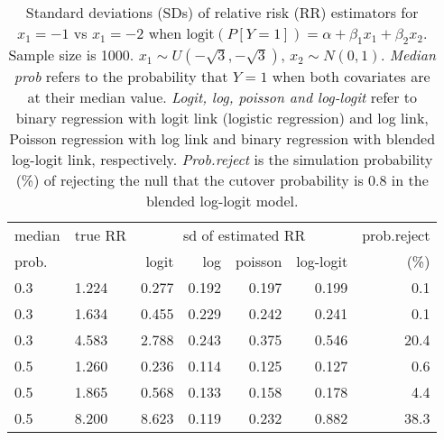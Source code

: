 \documentclass[12pt,a4paper]{article}
\begin{document}
\begin{table}[H] 
\small\sf\centering 
\caption{Standard deviations (SDs) of relative risk (RR) estimators for $x_1=-1$ vs $x_1=-2$ when $\mbox{logit}(P[Y=1])=\alpha+\beta_1 x_1 + \beta_2 x_2$. Sample size is 1000. $x_1 \sim $$U(-\sqrt{3},-\sqrt{3})$, $x_2 \sim N(0,1)$. {\it Median prob} refers to the probability that $Y=1$ when both covariates are at their median value. {\it Logit, log, poisson and log-logit} refer to binary regression with logit link (logistic regression) and log link, Poisson regression with log link and binary regression with blended log-logit link, respectively. {\it Prob.reject} is the simulation probability (\%) of rejecting the null that the cutover probability is $0.8$ in the blended log-logit model.} 
\begin{tabular}{llrrrrr} 
\toprule 
median & true RR & \multicolumn{4}{c}{sd of estimated RR} & prob.reject \\ 
prob. & & logit & log & poisson & log-logit  & (\%) \\ \midrule 
0.3 & 1.224 & 0.277 & 0.192 & 0.197 & 0.199 &  0.1 \\  
0.3 & 1.634 & 0.455 & 0.229 & 0.242 & 0.241 &  0.1 \\  
0.3 & 4.583 & 2.788 & 0.243 & 0.375 & 0.546 & 20.4 \\  
0.5 & 1.260 & 0.236 & 0.114 & 0.125 & 0.127 &  0.6 \\  
0.5 & 1.865 & 0.568 & 0.133 & 0.158 & 0.178 &  4.4 \\  
0.5 & 8.200 & 8.623 & 0.119 & 0.232 & 0.882 & 38.3 \\  
\bottomrule 
\end{tabular} 
\end{table} 
\end{document}
